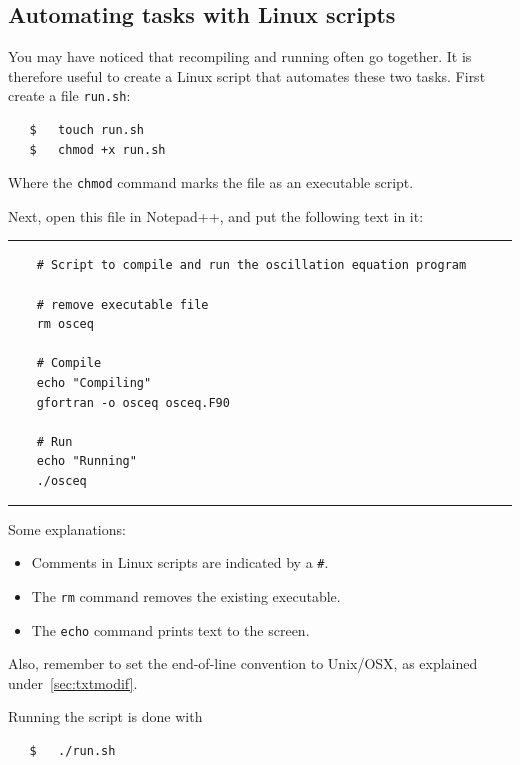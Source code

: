 \documentclass[a4paper]{article}
\begin{document}
\subsection{Automating tasks with Linux scripts}
%
\par
You may have noticed that recompiling and running often go together. It is therefore useful to create a Linux script that automates these two tasks. First create a file \texttt{run.sh}:
%
\begin{verbatim}
   $   touch run.sh
   $   chmod +x run.sh
\end{verbatim}
%
Where the \verb+chmod+ command marks the file as an executable script.
%
\par
Next, open this file in {Notepad++}, and put the following text in it:
%
{\vspace{10pt}\hrule\small\vspace*{-2pt}\begin{verbatim}
    # Script to compile and run the oscillation equation program
    
    # remove executable file
    rm osceq
    
    # Compile
    echo "Compiling"
    gfortran -o osceq osceq.F90
    
    # Run
    echo "Running"
    ./osceq
\end{verbatim}\hrule\vspace{5pt}}
%
%
Some explanations:
%
\begin{itemize}
	\item Comments in Linux scripts are indicated by a \verb+#+.
	\item The \verb+rm+ command removes the existing executable.
	\item The \verb+echo+ command prints text to the screen.
\end{itemize}
%
Also, remember to set the end-of-line convention to Unix/OSX, as explained under~\ref{sec:txtmodif}.
%
\par
Running the script is done with
%
\begin{verbatim}
   $   ./run.sh
\end{verbatim}
%
\end{document}
